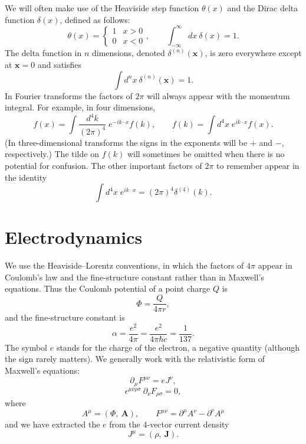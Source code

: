 We will often make use of the Heaviside step function $\theta(x)$ and the
Dirac delta function $\delta(x)$, defined as follows:
\begin{equation}
  \theta(x) = \begin{cases}1 & x>0\\ 0 & x<0 \end{cases},\qquad
  \int_{-\infty}^{\infty} \!\! dx\ \delta(x) = 1 .
\end{equation}
The delta function in $n$ dimensions, denoted $\delta^{(n)}(\mathbf{x})$,
is zero everywhere except at $\mathbf{x}=0$ and satisfies
\begin{equation}
  \int d^n x\ \delta^{(n)}(\mathbf{x}) = 1 .
\end{equation}
In Fourier transforms the factors of $2\pi$ will always appear with the
momentum integral.  For example, in four dimensions,
\begin{equation}
  f(x) = \int \frac{d^4k}{(2\pi)^4}\; e^{-ik\cdot x} f(k),\qquad
  f(k) = \int d^4x\; e^{ik\cdot x} f(x) .
\end{equation}
(In three-dimensional transforms the signs in the exponents will be $+$
and $-$, respectively.)  The tilde on $f(k)$ will sometimes be omitted when
there is no potential for confusion.  The other important factors of $2\pi$
to remember appear in the identity
\begin{equation}
  \int d^4x\; e^{ik\cdot x} = (2\pi)^4 \delta^{(4)}(k) .
\end{equation}

\section*{Electrodynamics}

We use the Heaviside--Lorentz conventions, in which the factors of $4\pi$
appear in Coulomb's law and the fine-structure constant rather than in
Maxwell's equations.  Thus the Coulomb potential of a point charge $Q$ is
\begin{equation}
  \Phi = \frac{Q}{4\pi r} ,
\end{equation}
and the fine-structure constant is
\begin{equation}
  \alpha = \frac{e^2}{4\pi} = \frac{e^2}{4\pi \hbar c} = \frac{1}{137} .
\end{equation}
The symbol $e$ stands for the charge of the electron, a negative quantity
(although the sign rarely matters).  We generally work with the
relativistic form of Maxwell's equations:
\begin{equation}
  \partial_\mu F^{\mu\nu} = e J^\nu ,
\end{equation}
\begin{equation}
  \epsilon^{\mu\nu\rho\sigma}\ \partial_\nu F_{\rho\sigma} = 0 ,
\end{equation}
where
\begin{equation}
  A^\mu = (\Phi,\ \mathbf{A}),\qquad
  F^{\mu\nu} = \partial^\mu A^\nu - \partial^\nu A^\mu
\end{equation}
and we have extracted the $e$ from the 4-vector current density
\begin{equation}
  J^\mu = (\rho,\ \mathbf{J}) .
\end{equation}

